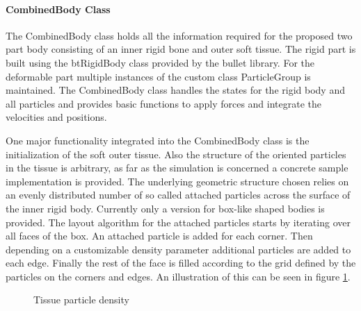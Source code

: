 \paragraph{CombinedBody Class}
The CombinedBody class holds all the information required for the proposed two part body consisting of an inner rigid bone and outer soft tissue. The rigid part is built using the btRigidBody class provided by the bullet library. For the deformable part multiple instances of the custom class ParticleGroup is maintained. The CombinedBody class handles the states for the rigid body and all particles and provides basic functions to apply forces and integrate the velocities and positions.

One major functionality integrated into the CombinedBody class is the initialization of the soft outer tissue. Also the structure of the oriented particles in the tissue is arbitrary, as far as the simulation is concerned a concrete sample implementation is provided. The underlying geometric structure chosen relies on an evenly distributed number of so called attached particles across the surface of the inner rigid body. Currently only a version for box-like shaped bodies is provided. The layout algorithm for the attached particles starts by iterating over all faces of the box. An attached particle is added for each corner. Then depending on a customizable density parameter additional particles are added to each edge. Finally the rest of the face is filled according to the grid defined by the particles on the corners and edges. An illustration of this can be seen in figure \ref{fig:combined_body_density}.

\begin{figure}[htb]
  \centering
\hspace{2cm}
  \caption{Tissue particle density}
  \label{fig:combined_body_density}
\end{figure}

